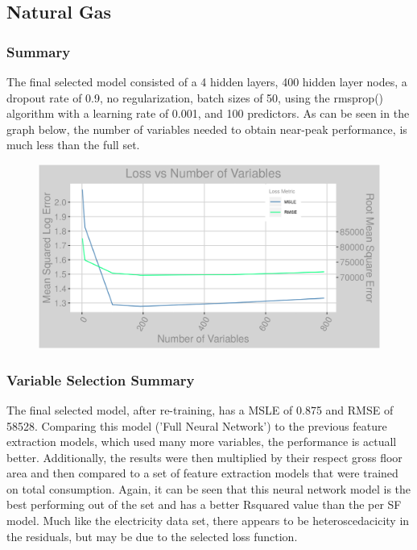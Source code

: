 \subsection{Natural Gas}
\subsubsection{Summary}
The final selected model consisted of a 4 hidden layers, 400 hidden layer nodes, a dropout rate of 0.9, no regularization, batch sizes of 50, using the rmsprop() algorithm with a learning rate of 0.001, and 100 predictors.  As can be seen in the graph below, the number of variables needed to obtain near-peak performance, is much less than the full set.

\begin{figure}[h]
\centering
\includegraphics[width=\textwidth, height=0.25\textheight]{Images/natural_gas_psf_nn_error.png}
\end{figure}

\subsubsection{Variable Selection Summary}
The final selected model, after re-training, has a MSLE of 0.875 and RMSE of 58528.  Comparing this model ('Full Neural Network') to the previous feature extraction models, which used many more variables, the performance is actuall better.  Additionally, the results were then multiplied by their respect gross floor area and then compared to a set of feature extraction models that were trained on total consumption.  Again, it can be seen that this neural network model is the best performing out of the set and has a better Rsquared value than the per SF model.  Much like the electricity data set, there appears to be heteroscedacicity in the residuals, but may be due to the selected loss function.

